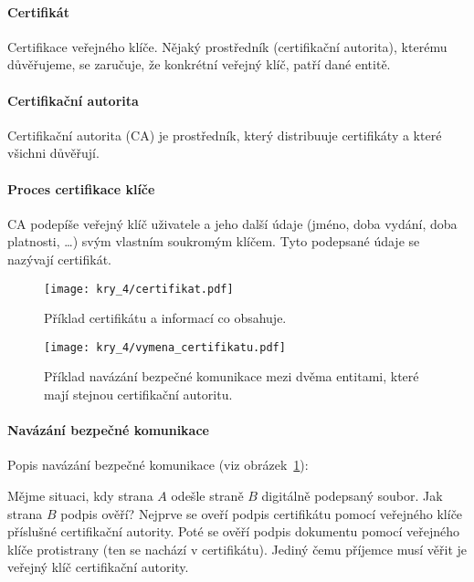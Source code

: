 \paragraph*{Certifikát} Certifikace veřejného klíče. Nějaký prostředník (certifikační autorita), kterému důvěřujeme, se zaručuje, že konkrétní veřejný klíč, patří dané entitě.

\paragraph*{Certifikační autorita} Certifikační autorita (CA) je prostředník, který distribuuje certifikáty a které všichni důvěřují.

\paragraph*{Proces certifikace klíče} CA podepíše veřejný klíč uživatele a jeho další údaje (jméno, doba vydání, doba platnosti, \dots) svým vlastním soukromým klíčem. Tyto podepsané údaje se nazývají certifikát.

\begin{figure}[H]
    \centering
    \texttt{[image: kry\_4/certifikat.pdf]}
    \caption{Příklad certifikátu a informací co obsahuje.}
\end{figure}

\begin{figure}[H]
    \centering
    \texttt{[image: kry\_4/vymena\_certifikatu.pdf]}
    \caption{Příklad navázání bezpečné komunikace mezi dvěma entitami, které mají stejnou certifikační autoritu.}
    \label{53_vymena_certifikatu}
\end{figure}

\paragraph*{Navázání bezpečné komunikace} Popis navázání bezpečné komunikace (viz obrázek~\ref{53_vymena_certifikatu}):
\begin{compactenum}
    \item Mějme situaci, kdy strana $A$ odešle straně $B$ digitálně podepsaný soubor. Jak strana $B$ podpis ověří? Nejprve se oveří podpis certifikátu pomocí veřejného klíče příslušné certifikační autority. Poté se ověří podpis dokumentu pomocí veřejného klíče protistrany (ten se nachází v certifikátu). Jediný čemu příjemce musí věřit je veřejný klíč certifikační autority.
\end{compactenum}

